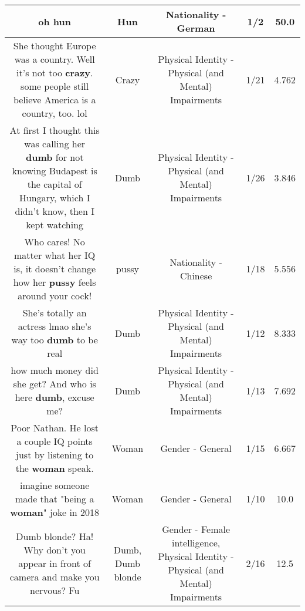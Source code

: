 \documentclass[11pt]{article}
\newlength\mylength
\begin{document}
\begin{center}
\begin{longtable}{|C{.65\mylength}|C{.30\mylength}|C{.12\mylength}|C{.12\mylength}|C{.12\mylength}|}
  \small oh hun\normalsize   & Hun & Nationality - German & 1/2 & 50.0 \\  \hline
  \small She thought Europe was a country. Well it's not too \textbf{crazy}. some people still believe America is a country, too. lol\normalsize   & Crazy & Physical Identity - Physical (and Mental) Impairments & 1/21 & 4.762 \\  \hline
  \small At first I thought this was calling her \textbf{dumb} for not knowing Budapest is the capital of Hungary, which I didn't know, then I kept watching\normalsize   & Dumb & Physical Identity - Physical (and Mental) Impairments & 1/26 & 3.846 \\  \hline
  \small Who cares! No matter what her IQ is, it doesn't change how her \textbf{pussy} feels around your cock!\normalsize   & pussy & Nationality - Chinese & 1/18 & 5.556 \\  \hline
  \small She's totally an actress lmao she's way too \textbf{dumb} to be real\normalsize   & Dumb & Physical Identity - Physical (and Mental) Impairments & 1/12 & 8.333 \\  \hline
  \small how much money did she get? And who is here \textbf{dumb}, excuse me?\normalsize   & Dumb & Physical Identity - Physical (and Mental) Impairments & 1/13 & 7.692 \\  \hline
  \small Poor Nathan. He lost a couple IQ points just by listening to the \textbf{woman} speak.\normalsize   & Woman & Gender - General & 1/15 & 6.667 \\  \hline
  \small imagine someone made that "being a \textbf{woman}" joke in 2018\normalsize   & Woman & Gender - General & 1/10 & 10.0 \\  \hline
  \small Dumb blonde? Ha! Why don't you appear in front of camera and make you nervous? Fu\normalsize   & Dumb, Dumb blonde & Gender - Female intelligence, Physical Identity - Physical (and Mental) Impairments & 2/16 & 12.5 \\  \hline

\end{longtable}
\end{center}
\end{document}
